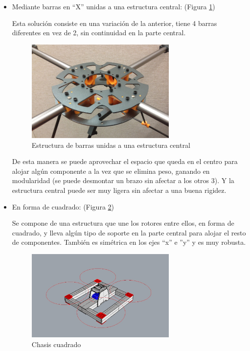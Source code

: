 \documentclass[12pt,twoside]{article}
\begin{document}
\begin{itemize}
		\item Mediante barras en “X” unidas a una estructura central:  (Figura \ref{fig:chasis_X_central})

Esta solución consiste en una variación de la anterior, tiene 4 barras diferentes en vez de 2, sin continuidad en la parte central.
		\begin{figure}
			\centering
			\includegraphics[width=0.7\textwidth]{Imatges/Disseny_Chasis/Chasis_4barras.png}
			\caption{Estructura de barras unidas a una estructura central}
			\label{fig:chasis_X_central}
		\end{figure}

De esta manera se puede aprovechar el espacio que queda en el centro para alojar algún componente a la vez que se elimina peso, ganando en modularidad (se puede desmontar un brazo sin afectar a los otros 3). Y la estructura central puede ser muy ligera sin afectar a una buena rigidez.
		\item En forma de cuadrado:  (Figura \ref{fig:chasis_cuadrado})

Se compone de una estructura que une los rotores entre ellos, en forma de cuadrado, y lleva algún tipo de soporte en la parte central para alojar el resto de componentes. También es simétrica en los ejes “x” e ”y” y es muy robusta.

		\begin{figure}
			\centering
			\includegraphics[width=0.7\textwidth]{Imatges/Disseny_Chasis/Chasis_cuadrado.png}
			\caption{Chasis cuadrado}
			\label{fig:chasis_cuadrado}
		\end{figure}
		\end{itemize}
		
\end{document}
